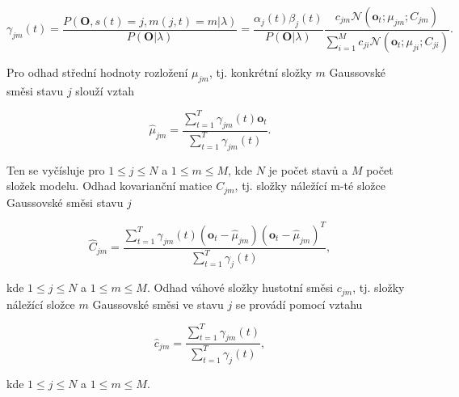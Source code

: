 \begin{equation}
  \gamma_{jm}\left(t\right) = \frac{P\left(\boldsymbol{O}, s\left(t\right)=j, m\left(j,t\right)=m|\lambda\right)}{P\left(\boldsymbol{O}|\lambda\right)} = \frac{\alpha_{j}\left(t\right)\beta_{j}\left(t\right)}{P\left(\boldsymbol{O}|\lambda\right)} \frac{c_{jm}\mathcal{N}\left(\boldsymbol{o}_t;\mu_{jm}; C_{jm}\right)}{\sum_{i=1}^{M} c_{ji} \mathcal{N}\left(\boldsymbol{o}_t;\mu_{ji};C_{ji}\right) }.
  \label{eq:asr:acoustic:structure:gamma:one}
\end{equation}

\noindent Pro odhad střední hodnoty rozložení $\mu_{jm}$, tj. konkrétní složky $m$ Gaussovské směsi stavu $j$ slouží vztah

\begin{equation}
  \hat{\mu}_{jm} = \frac{\sum_{t=1}^{T}\gamma_{jm}\left(t\right)\boldsymbol{o}_t}{\sum_{t=1}^{T}\gamma_{jm}\left(t\right)}.
  \label{eq:asr:acoustic:structure:mu}
\end{equation}

\noindent Ten se vyčísluje pro $1 \leq j \leq N$ a $1 \leq m \leq M$, kde $N$ je počet stavů a $M$ počet složek modelu. Odhad kovarianční matice $C_{jm}$, tj. složky náležící m-té složce Gaussovské směsi stavu $j$

\begin{equation}
  \hat{C}_{jm} = \frac{\sum_{t=1}^{T} \gamma_{jm}\left(t\right)\left(\boldsymbol{o}_t - \hat{\mu}_{jm}\right)\left(\boldsymbol{o}_t - \hat{\mu}_{jm}\right)^{T}}{\sum_{t=1}^{T}\gamma_j\left(t\right)},
  \label{eq:asr:acoustic:structure:covariant}
\end{equation}

\noindent kde $1 \leq j \leq N$ a $1 \leq m \leq M$. Odhad váhové složky hustotní směsi $c_{jm}$, tj. složky náležící složce $m$ Gaussovské směsi ve stavu $j$ se provádí pomocí vztahu

\begin{equation}
  \hat{c}_{jm} = \frac{\sum_{t=1}^{T} \gamma_{jm}\left(t\right)}{\sum_{t=1}^{T}\gamma_j\left(t\right)},
  \label{eq:asr:acoustic:structure:weight}
\end{equation}

\noindent kde $1 \leq j \leq N$ a $1 \leq m \leq M$.

